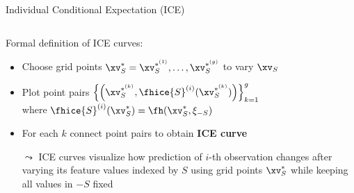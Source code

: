 \documentclass[11pt,compress,t,notes=noshow, aspectratio=169, xcolor=table]{beamer}
\begin{document}
\begin{frame}[c]{Individual Conditional Expectation (ICE) }
\begin{columns}[T]
\begin{column}{0.84\textwidth}
\medskip

Formal definition of ICE curves: 
\begin{itemize}
    \item Choose grid points $\xv_S^* = \xv_S^{*^{(1)}}, \dots, \xv_S^{*^{(g)}}$ to vary $\xv_S$
    \item Plot point pairs $ \Bigl\{\left(\xv_S^{*^{(k)}}, \fhice{S}^{(i)}(\xv_S^{*^{(k)}}) \right) \Bigr\}_{k=1}^g$
    \\where $\fhice{S}^{(i)}(\xv_S^*) = \fh(\xv_S^*, \xi_{-S})$
    \item For each $k$ connect point pairs to obtain \textbf{ICE curve}
\end{itemize}

\medskip

\begin{itemize}
    \item[$\leadsto$] ICE curves visualize how prediction of $i$-th observation changes after varying its feature values indexed by $S$ using grid points $\xv_S^*$ while keeping all values in $-S$ fixed

\end{itemize}



\end{column}
\end{columns}




\end{frame}
\end{document}
